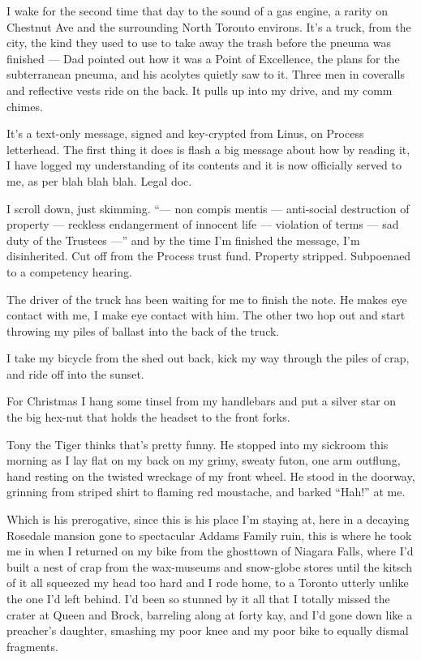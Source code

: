 \tb

I wake for the second time that day to the sound of a gas engine, a
rarity on Chestnut Ave and the surrounding North Toronto environs.
It's a truck, from the city, the kind they used to use to take away
the trash before the pneuma was finished --- Dad pointed out how it
was a Point of Excellence, the plans for the subterranean pneuma,
and his acolytes quietly saw to it. Three men in coveralls and
reflective vests ride on the back. It pulls up into my drive, and
my comm chimes.

It's a text-only message, signed and key-crypted from Linus, on
Process letterhead. The first thing it does is flash a big message
about how by reading it, I have logged my understanding of its
contents and it is now officially served to me, as per blah blah
blah. Legal doc.

I scroll down, just skimming.
``--- non compis mentis --- anti-social destruction of property --- reckless 
endangerment of innocent life --- violation of terms --- sad duty of the 
Trustees ---''
and by the time I'm finished the message, I'm disinherited. Cut off
from the Process trust fund. Property stripped. Subpoenaed to a
competency hearing.

The driver of the truck has been waiting for me to finish the note.
He makes eye contact with me, I make eye contact with him. The
other two hop out and start throwing my piles of ballast into the
back of the truck.

I take my bicycle from the shed out back, kick my way through the
piles of crap, and ride off into the sunset.

\tb

For Christmas I hang some tinsel from my handlebars and put a
silver star on the big hex-nut that holds the headset to the front
forks.

Tony the Tiger thinks that's pretty funny. He stopped into my
sickroom this morning as I lay flat on my back on my grimy, sweaty
futon, one arm outflung, hand resting on the twisted wreckage of my
front wheel. He stood in the doorway, grinning from striped shirt
to flaming red moustache, and barked ``Hah!'' at me.

Which is his prerogative, since this is his place I'm staying at,
here in a decaying Rosedale mansion gone to spectacular Addams
Family ruin, this is where he took me in when I returned on my bike
from the ghosttown of Niagara Falls, where I'd built a nest of crap
from the wax-museums and snow-globe stores until the kitsch of it
all squeezed my head too hard and I rode home, to a Toronto utterly
unlike the one I'd left behind. I'd been so stunned by it all that
I totally missed the crater at Queen and Brock, barreling along at
forty kay, and I'd gone down like a preacher's daughter, smashing
my poor knee and my poor bike to equally dismal fragments.

